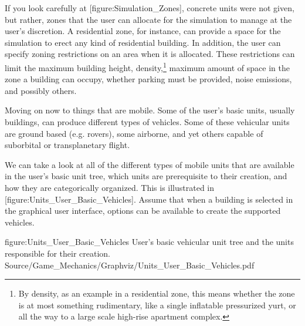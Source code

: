 \page
{}
    {}

If you look carefully at [figure:Simulation_Zones], concrete units were not given, but rather, zones that the user can allocate for the simulation to manage at the user's discretion. A residential zone, for instance, can provide a space for the simulation to erect any kind of residential building. In addition, the user can specify zoning restrictions on an area when it is allocated. These restrictions can limit the maximum building height, density,\footnote{By density, as an example in a residential zone, this means whether the zone is at most something rudimentary, like a single inflatable pressurized yurt, or all the way to a large scale high-rise apartment complex.} maximum amount of space in the zone a building can occupy, whether parking must be provided, noise emissions, and possibly others.

Moving on now to things that are mobile. Some of the user's basic units, usually buildings, can produce different types of vehicles. Some of these vehicular units are ground based (e.g. rovers), some airborne, and yet others capable of suborbital or transplanetary flight. 

We can take a look at all of the different types of mobile units that are available in the user's basic unit tree, which units are prerequisite to their creation, and how they are categorically organized. This is illustrated in [figure:Units_User_Basic_Vehicles]. Assume that when a building is selected in the graphical user interface, options can be available to create the supported vehicles.

\FullPageDiagram
    {figure:Units_User_Basic_Vehicles}
    {User's basic vehicular unit tree and the units responsible for their creation.}
    {Source/Game_Mechanics/Graphviz/Units_User_Basic_Vehicles.pdf}

